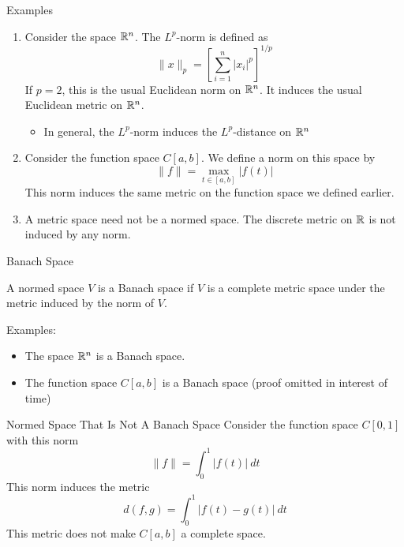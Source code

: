 \documentclass[10pt]{beamer}
\begin{document}
		\begin{frame}{Examples}
				\begin{enumerate}
						\item<1-> Consider the space $\mathbb{R}^n$. The $L^p$-norm is defined as 
								\begin{equation*}
										\|x\|_p = \left[ \sum_{i=1}^{n} |x_i|^p \right]^{1/p}
								\end{equation*}
								If $p = 2$, this is the usual Euclidean norm on $\mathbb{R}^n$. It induces the usual Euclidean metric on $\mathbb{R}^n$. 
								\begin{itemize}
										\item In general, the $L^p$-norm induces the $L^p$-distance on $\mathbb{R}^n$
								\end{itemize}

						\item<2-> Consider the function space $C[a,b]$. We define a norm on this space by 
								\begin{equation*}
										\|f\| = \max_{t\in [a,b]} |f(t)|
								\end{equation*}
								This norm induces the same metric on the function space we defined earlier. 

						\item<3-> A metric space need not be a normed space. The discrete metric on $\mathbb{R}$ is not induced by any norm.
				\end{enumerate}
		\end{frame}


		\begin{frame}{Banach Space}
				\begin{definition}
						A normed space $V$ is a \alert{Banach space} if $V$ is a complete metric space under the metric induced by the norm of $V$. 
				\end{definition}
				Examples: 
				\begin{itemize}
						\item The space $\mathbb{R}^n$ is a Banach space. 
						\item The function space $C[a,b]$ is a Banach space (proof omitted in interest of time)
				\end{itemize}
		\end{frame}

		\begin{frame}{Normed Space That Is Not A Banach Space}
				Consider the function space $C[0,1]$ with this norm 
				\begin{equation*}
						\|f\| = \int_0^1 |f(t)|\ dt 
				\end{equation*}
				This norm induces the metric 
				\begin{equation*}
						d(f, g) = \int_0^1 |f(t) - g(t)|\ dt
				\end{equation*}
				This metric does not make $C[a,b]$ a complete space. 
		\end{frame}
\end{document}
